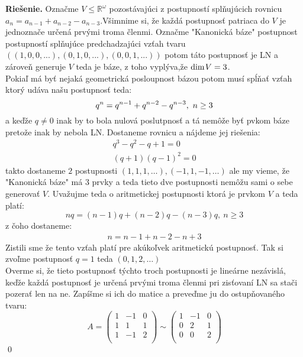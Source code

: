 \documentclass{article}
\theoremstyle{definition}
\theoremstyle{plain}
\newcommand{\R}{\mathbb{R}}
\newcommand{\dim}{\text{dim\hspace{0.1em}}}
\newenvironment{solution}{\noindent\textbf{Riešenie.}\hspace{0.5em}}{\hfill\qed\medskip}
\begin{document}
\begin{solution}
Označme $V \leq\R^\omega$ pozostávajúci z postupností splňujúcich rovnicu $a_n =a_{n-1}+a_{n-2}-a_{n-3}$.Všimnime si, že každá postupnosť patriaca do $V$ je jednoznače určená prvými troma členmi. Označme "Kanonická báze" postupnost postupností splňujúce predchadzajúci vzťah tvaru $((1,0,0,...),(0,1,0,...),(0,0,1,...))$ potom táto postupnosť je LN a zároveň generuje $V$ teda je báze, z toho vyplýva,že $\dim V = 3$.\\

Pokiaľ má byť nejaká geometrická posloupnost bázou potom musí spĺňať vzťah ktorý udáva našu postupnosť teda:
\begin{equation*}
        q^n = q^{n-1}+q^{n-2}- q^{n-3},\ n\geq 3\\
\end{equation*}
a keďže $q\neq0$ inak by to bola nulová poslutpnosť a tá nemôže byť pvkom báze pretože inak by nebola LN. Dostaneme rovnicu a nájdeme jej riešenia:
\begin{align}
      q^3-q^2-q+1=0  \\
      (q+1)(q-1)^2=0
\end{align}
takto dostaneme $2$ postupnosti $(1,1,1,\dots),(-1,1,-1,\dots)$ ale my vieme, že "Kanonická báze" má $3$ prvky a teda tieto dve postupnosti nemôžu sami o sebe generovať $V$. Uvažujme teda o aritmetickej postupnosti ktorá je prvkom $V$ a teda platí:
\begin{equation*}
    nq = (n-1)q+(n-2)q-(n-3)q,\ n\geq 3
\end{equation*}
z čoho dostaneme:
\begin{align*}
    n = n-1+n-2-n+3  
\end{align*}
Zistili sme že tento vzťah platí pre akúkoľvek aritmetickú postupnosť. Tak si zvoľme postupnosť $q=1 $ teda $(0,1,2,\dots)$\\
Overme si, že tieto postupnosť týchto troch postupnosti je lineárne nezávislá, keďže každá postupnosť je určená prvými troma členmi pri zisťovaní LN sa stači pozerať len na ne. Zapíšme si ich do matice a preveďme ju do ostupňovaného tvaru:
\begin{equation*}
A=
    \begin{pmatrix}
        1 & -1 & 0\\
        1 & 1 & 1\\
        1 & -1 & 2\\

    \end{pmatrix}
    \sim 
    \begin{pmatrix}
                1 & -1 & 0\\
        0 & 2 & 1\\
        0 & 0 & 2\\


\end{pmatrix}
\end{equation*}
\end{solution}
\end{document}
